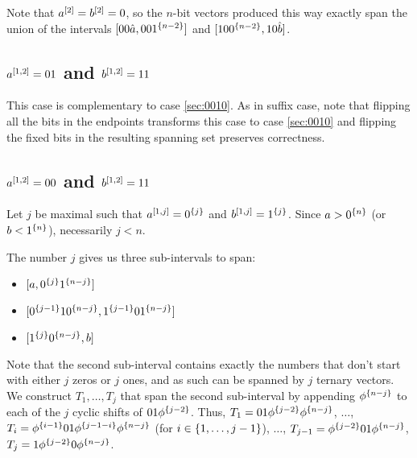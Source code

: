 Note that $a^{[2]} = b^{[2]} = 0$,
so the $n$-bit vectors produced this way
exactly span the union of the intervals
$[00 \hat{a}, 00 1^{\{n-2\}}]$
and $[10 0^{\{n-2\}}, 10 \hat{b}]$.

\subsection{\texorpdfstring
{$a^{[1, 2]} = 01$ and $b^{[1, 2]} = 11$}
{ = 01 and  = 11}
}

This case is complementary to case \ref{sec:0010}.
As in suffix case,
note that flipping all the bits in the endpoints
transforms this case to case \ref{sec:0010}
and flipping the fixed bits in the resulting spanning set
preserves correctness.

\subsection{\texorpdfstring
{$a^{[1, 2]} = 00$ and $b^{[1, 2]} = 11$}
{ = 00 and  = 11}
}
\label{sec:1interval0011}

Let $j$ be maximal such that
$a^{[1, j]} = 0^{\{j\}}$ and
$b^{[1, j]} = 1^{\{j\}}$.
Since $a > 0^{\{n\}}$ (or $b < 1^{\{n\}}$),
necessarily $j < n$.

The number $j$ gives us three sub-intervals to span:

\begin{itemize}
\item $[a, 0^{\{j\}} 1^{\{n-j\}}]$
\item $[0^{\{j-1\}} 1 0^{\{n-j\}}, 1^{\{j-1\}} 0 1^{\{n-j\}}]$
\item $[1^{\{j\}} 0^{\{n-j\}}, b]$
\end{itemize}

Note that the second sub-interval contains exactly
the numbers that don't start with either $j$ zeros
or $j$ ones,
and as such can be spanned by $j$ ternary vectors.
We construct $T_1, \ldots, T_j$ that span
the second sub-interval
by appending $\phi^{\{n-j\}}$
to each of the $j$ cyclic shifts of $01 \phi^{\{j-2\}}$.
Thus,
$T_1 = 01 \phi^{\{j-2\}} \phi^{\{n-j\}}$,
$\ldots$,
$T_i = \phi^{\{i-1\}} 01 \phi^{\{j-1-i\}} \phi^{\{n-j\}}$
(for $i \in \{1, \ldots, j-1\}$),
$\ldots$,
$T_{j-1} = \phi^{\{j-2\}} 01 \phi^{\{n-j\}}$,
$T_j = 1 \phi^{\{j-2\}} 0 \phi^{\{n-j\}}$.

